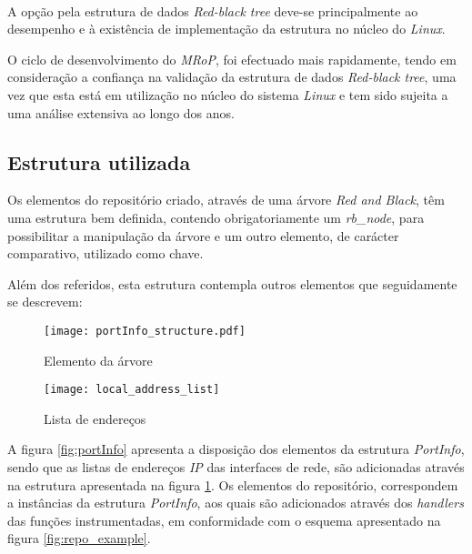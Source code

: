 \paragraph*{}
A opção pela estrutura de dados \textit{Red-black tree} deve-se principalmente ao desempenho e à existência de implementação da estrutura no núcleo do \textit{Linux}.

O ciclo de desenvolvimento do \textit{MRoP}, foi efectuado mais rapidamente, tendo em consideração a confiança na validação da estrutura de dados \textit{Red-black tree}, uma vez que esta está em utilização no núcleo do sistema \textit{Linux} e tem sido sujeita a uma análise extensiva ao longo dos anos.
 
\subsection{Estrutura utilizada}
\label{sub:repo_structure}

Os elementos do repositório criado, através de uma árvore \textit{Red and Black}, têm uma estrutura bem definida, contendo obrigatoriamente um \textit{rb\_node}, para possibilitar a manipulação da árvore e um outro elemento, de carácter comparativo, utilizado como chave.

Além dos referidos, esta estrutura contempla outros elementos que seguidamente se descrevem:

\begin{figure}[ht]
\begin{minipage}[b]{0.5\linewidth}
\centering
\texttt{[image: portInfo\_structure.pdf]}
\caption{Elemento da árvore}
\label{fig:portInfo}
\end{minipage}
\hspace{0.5cm}
\begin{minipage}[b]{0.5\linewidth}
\centering
\texttt{[image: local\_address\_list]}
\caption{Lista de endereços}
\label{fig:local_address_list}
\end{minipage}
\end{figure}

A figura \ref{fig:portInfo} apresenta a disposição dos elementos da estrutura \textit{PortInfo}, sendo que as listas de endereços \textit{IP} das interfaces de rede, são adicionadas através na estrutura apresentada na figura \ref{fig:local_address_list}.
Os elementos do repositório, correspondem a instâncias da estrutura \textit{PortInfo}, aos quais são adicionados através dos \textit{handlers} das funções instrumentadas, em conformidade com o esquema apresentado na figura \ref{fig:repo_example}.

